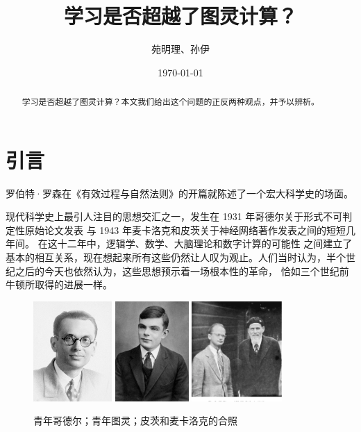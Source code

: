 \documentclass[a4paper,12pt]{article}
\title{学习是否超越了图灵计算？}
\date{\nianyueri\today}
\author{苑明理、孙伊}
\numberwithin{problem}{section}
\numberwithin{definition}{section}
\numberwithin{lemma}{section}
\numberwithin{proposition}{section}
\numberwithin{theorem}{section}
\numberwithin{grammar}{section}
\numberwithin{program}{section}
\numberwithin{convention}{section}
\numberwithin{corollary}{section}
\begin{document}

\maketitle
\begin{abstract}
    学习是否超越了图灵计算？本文我们给出这个问题的正反两种观点，并予以辨析。
\end{abstract}

\renewcommand\contentsname{目录}
\setcounter{tocdepth}{2}
\tableofcontents
\newpage

\section{引言}

罗伯特·罗森在《有效过程与自然法则》\cite{Rosen1988EffectivePA}的开篇就陈述了一个宏大科学史的场面。
\begin{displayquote}
现代科学史上最引人注目的思想交汇之一，发生在 1931 年哥德尔关于形式不可判定性原始论文发表
与 1943 年麦卡洛克和皮茨关于神经网络著作发表之间的短短几年间。 在这十二年中，逻辑学、数学、大脑理论和数字计算的可能性
之间建立了基本的相互关系，现在想起来所有这些仍然让人叹为观止。人们当时认为，半个世纪之后的今天也依然认为，这些思想预示着一场根本性的革命，
恰如三个世纪前牛顿所取得的进展一样。
\end{displayquote}

\begin{figure}[ht]
\centering
\includegraphics[height=1.5in]{images/kurt_godel.jpg}
\includegraphics[height=1.5in]{images/alan_turing.jpg}
\includegraphics[height=1.5in]{images/pitts_mcculloch_1949.png}
\caption{青年哥德尔；青年图灵；皮茨和麦卡洛克的合照}
\end{figure}
\end{document}
